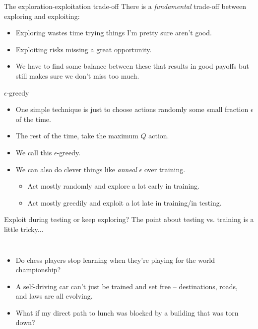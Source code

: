 \documentclass{beamer}
\begin{document}
\begin{frame}{The exploration-exploitation trade-off}
There is a \emph{fundamental} trade-off between exploring and exploiting:
\begin{itemize}
    \item<2-> Exploring wastes time trying things I'm pretty sure aren't good.
    \item<3-> Exploiting risks missing a great opportunity.
    \item<4-> We have to find some balance between these that results in good payoffs but still makes sure we don't miss too much.
\end{itemize}
\end{frame}

\begin{frame}{\(\epsilon\)-greedy}
\begin{itemize}
    \item One simple technique is just to choose actions randomly some small fraction \(\epsilon\) of the time. 
    \item<2-> The rest of the time, take the maximum \(Q\) action. 
    \item<3-> We call this \(\epsilon\)-greedy.
    \item<4-> We can also do clever things like \emph{anneal} \(\epsilon\) over training.
        \begin{itemize} 
        \item Act mostly randomly and explore a lot early in training.
        \item Act mostly greedily and exploit a lot late in training/in testing.
        \end{itemize}
\end{itemize}
\end{frame}

\begin{frame}{Exploit during testing or keep exploring?}
The point about testing vs. training is a little tricky... 
\begin{columns}
\begin{itemize}
    \item<1-> Do chess players stop learning when they're playing for the world championship? 
    \item<2-> A self-driving car can't just be trained and set free -- destinations, roads, and laws are all evolving.
    \item<3-> What if my direct path to lunch was blocked by a building that was torn down? 
\end{itemize}
    \begin{center}
    \end{center}
\end{columns}
\end{frame}
\end{document}
